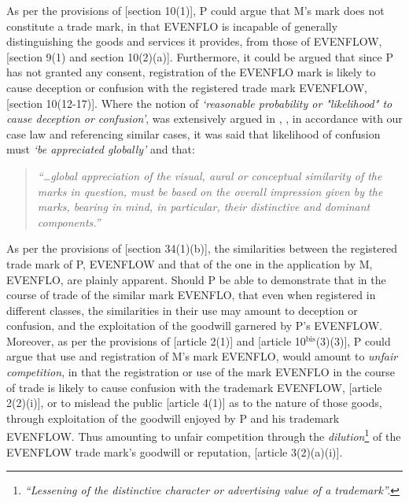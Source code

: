 \documentclass[11pt]{article}
\begin{document}
As per the provisions of [section 10(1)]\cite{rsa93_tm_act}, P could argue that
M's mark does not constitute a trade mark, in that EVENFLO is incapable of
generally distinguishing the goods and services it provides, from those of
EVENFLOW, [section 9(1) and section 10(2)(a)]\cite{rsa93_tm_act}. Furthermore, it
could be argued that since P has not granted any consent, registration of the
EVENFLO mark is likely to cause deception or confusion with the registered trade
mark EVENFLOW, [section 10(12-17)]\cite{rsa93_tm_act}. Where the notion of
\emph{`reasonable probability or "likelihood" to cause deception or confusion'}, was
extensively argued in ,
\cite{harms01_cowbell_v_ics}, in accordance with our case law and referencing
similar cases, it was said that likelihood of confusion must \emph{`be appreciated
globally'} and that:
\begin{quote}
\emph{``\ldots{}global appreciation of the visual, aural or conceptual similarity of the marks in question, must be based on the overall impression given by the marks, bearing in mind, in particular, their distinctive and dominant components.''}
\end{quote}


As per the provisions of [section 34(1)(b)]\cite{rsa93_tm_act}, the similarities between the registered trade mark of P, EVENFLOW and that of the one in the application by M, EVENFLO, are plainly apparent. Should P be able to demonstrate that in the course of trade of the similar mark EVENFLO, that even when registered in different classes, the similarities in their use may amount to deception or confusion, and the exploitation of the goodwill garnered by P's EVENFLOW.\\

Moreover, as per the provisions of [article 2(1)]\cite{wipo96_model_provi_unfair_comp} and [article 10\(^{\text{bis}}\)(3)(3)]\cite{wipo83_paris_conve_protect_ip}, P could argue that use and registration of M's mark EVENFLO, would amount to \emph{unfair competition}, in that the registration or use of the mark EVENFLO in the course of trade is likely to cause confusion with the trademark EVENFLOW, [article 2(2)(i)]\cite{wipo96_model_provi_unfair_comp}, or to mislead the public [article 4(1)]\cite{wipo96_model_provi_unfair_comp} as to the nature of those goods, through exploitation of the goodwill enjoyed by P and his trademark EVENFLOW. Thus amounting to unfair competition through the \emph{dilution}\footnote{\emph{``Lessening of the distinctive character or advertising value of a trademark''.}} of the EVENFLOW trade mark's goodwill or reputation, [article 3(2)(a)(i)]\cite{wipo96_model_provi_unfair_comp}.

\printbibliography
\end{document}
